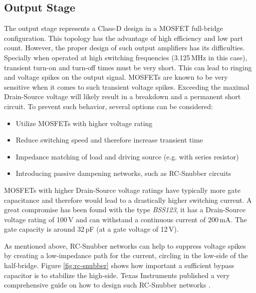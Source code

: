 \subsection{Output Stage}
The output stage represents a Class-D design in a MOSFET full-bridge configuration. This topology has the advantage of high efficiency and low part count. However, the proper design of such output amplifiers has its difficulties. Specially when operated at high switching frequencies (3.125\,MHz in this case), transient turn-on and turn-off times must be very short. This can lead to ringing and voltage spikes on the output signal.
MOSFETs are known to be very sensitive when it comes to such transient voltage spikes. Exceeding the maximal Drain-Source voltage will likely result in a breakdown and a permanent short circuit. To prevent such behavior, several options can be considered:

\begin{itemize}
    \item Utilize MOSFETs with higher voltage rating
    \item Reduce switching speed and therefore increase transient time
    \item Impedance matching of load and driving source (e.g. with series resistor)
    \item Introducing passive dampening networks, such as RC-Snubber circuits
\end{itemize}

MOSFETs with higher Drain-Source voltage ratings have typically more gate capacitance and therefore would lead to a drastically higher switching current. A great compromise has been found with the type \textit{BSS123}, it has a Drain-Source voltage rating of 100\,V and can withstand a continuous current of 200\,mA. The gate capacity is around 32\,pF (at a gate voltage of 12\,V). 

As mentioned above, RC-Snubber networks can help to suppress voltage spikes by creating a low-impedance path for the current, circling in the low-side of the half-bridge. Figure \ref{fig:rc-snubber} shows how important a sufficient bypass capacitor is to stabilize the high-side. Texas Instruments published a very comprehensive guide on how to design such RC-Snubber networks \cite{ti_class_d_snubber_design}.  

